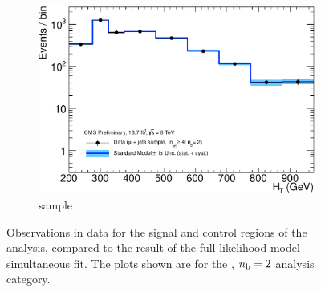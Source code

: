 \begin{figure}[h!]
\begin{subfigure}[b]{0.48\textwidth}
    \includegraphics[width=\textwidth]
    {Figs/results/v0/blueBand/single_plots/muon_2b_ge4j_logy.pdf}
    \caption{\mj sample}
  \end{subfigure}
  \caption{Observations in data for the signal and control
  regions of the analysis, compared to the result of the full likelihood model
  simultaneous fit. The plots shown are for the \njhigh, $n_{\text{b}} = 2$ analysis category.}
  \label{fig:blue_fits_2b_ge4j}
\end{figure}


